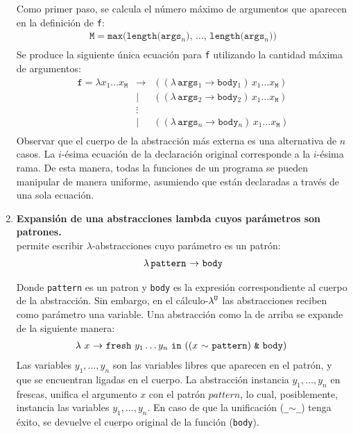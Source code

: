 \begin{enumerate}
    Como primer paso, se calcula el número máximo de argumentos que aparecen
    en la definición de \verb|f|:
    \[
    \begin{array}{c}
      \texttt{M}  = \texttt{max(length(args$_n$), $\hdots$, length(args$_n$))}\\
    \end{array}
    \]
    Se produce la siguiente única ecuación para \texttt{f} utilizando la cantidad máxima de argumentos:
    \[
    \begin{array}{crr}
      \texttt{f}  = \lambda x_1 \dots x_\texttt{M}
      & \rightarrow & ((\lambda\,\texttt{args$_1$} \rightarrow \texttt{body$_1$})\, x_1 \dots x_\texttt{M}) \\
      & \vert       & ((\lambda\,\texttt{args$_2$} \rightarrow \texttt{body$_2$})\, x_1 \dots x_\texttt{M}) \\
      & \vdots      & \\
      & \vert       & ((\lambda\,\texttt{args$_n$} \rightarrow \texttt{body$_n$})\, x_1 \dots x_\texttt{M}) \\
    \end{array}
    \]
    Observar que el cuerpo de la abstracción más externa
    es una alternativa de $n$ casos.
    La $i$-ésima ecuación de la declaración original corresponde
    a la $i$-ésima rama.
    De esta manera, todas la funciones de un programa \nuflo se
    pueden manipular de manera uniforme, asumiendo que están declaradas
    a través de una sola ecuación.

  \item {\bf Expansión de una abstracciones lambda cuyos parámetros son patrones.} \\
    \nuflo permite escribir $\lambda$-abstracciones cuyo parámetro es un patrón:
    $$
    \begin{array}{c}
        \text{$\lambda$\,\texttt{pattern} $\rightarrow$ \texttt{body}}\\
    \end{array}
    $$
    
    Donde \texttt{pattern} es un patron y \texttt{body} es la expresión correspondiente
    al cuerpo de la abstracción.
    Sin embargo, en el cálculo-$\lambda^{\mathtt{U}}$ las abstracciones reciben como
    parámetro una variable. 
    Una abstracción como la de arriba se expande de la siguiente manera:
    \[
    \begin{array}{c}
      \text{$\lambda$ $x$ $\rightarrow$ \texttt{fresh} $y_1 \hdots y_n$ \texttt{in} (($x$ $\sim$ \texttt{pattern}) \texttt{\&} \texttt{body}) }\\
    \end{array}
    \]
    Las variables $y_1,\hdots,y_n$ son las variables libres que aparecen en el
    patrón, y que se encuentran ligadas en el cuerpo.
    La abstracción instancia $y_1,\hdots,y_n$ en frescas,
    unifica el argumento $x$ con el patrón $pattern$,
    lo cual, posiblemente, instancia las variables $y_1,\hdots,y_n$.
    En caso de que la unificación (\texttt{\_$\sim$\_}) tenga éxito,
    se devuelve el cuerpo original de la función (\texttt{body}).
  

\end{enumerate}
